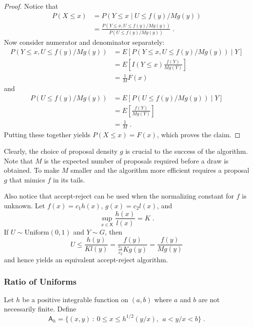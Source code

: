\documentclass[12pt]{article}
\theoremstyle{plain}
\theoremstyle{definition}
\theoremstyle{remark}
\newcommand{\sX}{\mathsf{X}}
\newcommand{\sA}{\mathsf{A}}
\begin{document}
\begin{proof}
Notice that
\begin{align*}
P(X \le x) & = P(Y \le x \mid U \le f(y) / M g(y)) \\
& =  \frac{P(Y \le x,  U \le f(y) / M g(y))}{P( U \le f(y) / M g(y)) }
\; .
\end{align*}
Now consider numerator and denominator separately:
\begin{align*}
P(Y \le x,  U \le f(y) / M g(y)) &= E \left[ P(Y \le x,  U \le f(y) / M
  g(y)) \mid  Y \right] \\
& = E \left[ I(Y \le x) \frac{f(Y)}{M g(Y)} \right] \\
& = \frac{1}{M} F(x)
\end{align*}
and
\begin{align*}
P( U \le f(y) / M g(y)) & = E \left[P( U \le f(y) / M g(y)) \mid Y \right]\\
& = E \left[ \frac{f(Y)}{Mg(Y)} \right]\\
& = \frac{1}{M} \; .
\end{align*}
Putting these together yields $P(X \le x) = F(x)$, which
proves the claim.
\end{proof}

Clearly, the choice of proposal density $g$ is crucial to the success
of the algorithm.  Note that $M$ is the expected number of proposals
required before a draw is obtained.  To make $M$ smaller and the
algorithm more efficient requires a proposal $g$ that mimics $f$ in
its tails.

Also notice that accept-reject can be used when the normalizing
constant for $f$ is unknown.  Let $f(x) =c_1 h(x)$, $g(x) = c_2 l(x)$,
and
\[
\sup_{x \in \sX} \frac{h(x)}{l(x)} = K\; .
\]
If $U \sim \text{Uniform}(0,1)$ and $Y \sim G$, then 
\[
U \le \frac{h(y)}{Kl(y)} = \frac{f(y)}{\frac{c_1}{c_2} K g(y)} = \frac{f(y)}{M g(y)}
\]
and hence yields an equivalent accept-reject algorithm.

\subsubsection{Ratio of Uniforms}

Let $h$ be a positive integrable function on $(a,b)$ where $a$ and
$b$ are not necessarily finite.  Define
\begin{equation}
\label{gofmc:eq:rou region}
\sA_h = \{(x,y)~:~ 0 \le x \le h^{1/2}(y/x), ~~a < y/x < b \} \; .
\end{equation}
\end{document}
